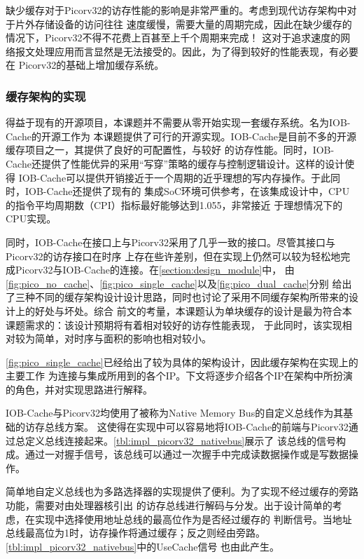 缺少缓存对于Picorv32的访存性能的影响是非常严重的。考虑到现代访存架构中对于片外存储设备的访问往往
速度缓慢，需要大量的周期完成，因此在缺少缓存的情况下，Picorv32不得不花费上百甚至上千个周期来完成！
这对于追求速度的网络报文处理应用而言显然是无法接受的。因此，为了得到较好的性能表现，有必要在
Picorv32的基础上增加缓存系统。

\subsubsection{缓存架构的实现}

得益于现有的开源项目，本课题并不需要从零开始实现一套缓存系统。名为IOB-Cache的开源工作\cite{roque2021iob}为
本课题提供了可行的开源实现。IOB-Cache是目前不多的开源缓存项目之一，其提供了良好的可配置性，与较好
的访存性能。同时，IOB-Cache还提供了性能优异的采用“写穿”策略的缓存与控制逻辑设计。这样的设计使得
IOB-Cache可以提供开销接近于一个周期的近乎理想的写内存操作。于此同时，IOB-Cache还提供了现有的
集成SoC环境可供参考，在该集成设计中，CPU的指令平均周期数（CPI）指标最好能够达到1.055，非常接近
于理想情况下的CPU实现。

同时，IOB-Cache在接口上与Picorv32采用了几乎一致的接口。尽管其接口与Picorv32的访存接口在时序
上存在些许差别，但在实现上仍然可以较为轻松地完成Picorv32与IOB-Cache的连接。在\autoref{section:design_module}中，
由\autoref{fig:pico_no_cache}、\autoref{fig:pico_single_cache}以及\autoref{fig:pico_dual_cache}分别
给出了三种不同的缓存架构设计设计思路，同时也讨论了采用不同缓存架构所带来的设计上的好处与坏处。综合
前文的考量，本课题认为单块缓存的设计是最为符合本课题需求的：该设计预期将有着相对较好的访存性能表现，
于此同时，该实现相对较为简单，对时序与面积的影响也相对较小。

\autoref{fig:pico_single_cache}已经给出了较为具体的架构设计，因此缓存架构在实现上的主要工作
为连接与集成所用到的各个IP。下文将逐步介绍各个IP在架构中所扮演的角色，并对实现思路进行解释。

IOB-Cache与Picorv32均使用了被称为Native Memory Bus的自定义总线作为其基础的访存总线方案。
这使得在实现中可以容易地将IOB-Cache的前端与Picorv32通过总定义总线连接起来。\autoref{tbl:impl_picorv32_nativebus}展示了
该总线的信号构成。通过一对握手信号，该总线可以通过一次握手中完成读数据操作或是写数据操作。

简单地自定义总线也为多路选择器的实现提供了便利。为了实现不经过缓存的旁路功能，需要对由处理器核引出
的访存总线进行解码与分发。出于设计简单的考虑，在实现中选择使用地址总线的最高位作为是否经过缓存的
判断信号。当地址总线最高位为1时，访存操作将通过缓存；反之则经由旁路。\autoref{tbl:impl_picorv32_nativebus}中的UseCache信号
也由此产生。

